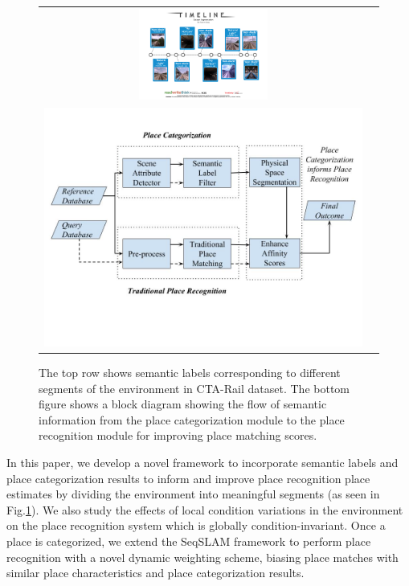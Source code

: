 \documentclass[letterpaper, 10 pt, conference]{ieeeconf}  %
\begin{document}
\begin{figure}
\centering
\begin{tabular}{cc}
	\includegraphics[clip, trim=2cm 4cm 2cm 4cm,width=6.5cm,height=3.0cm]{cta-dataset-segmentation-1}\\
	
	\includegraphics[clip, trim=0cm 4cm 0cm 2cm,scale=0.2]{flowchart}
\end{tabular}
	\caption{ The top row shows semantic labels corresponding to different segments of the environment in CTA-Rail dataset. The bottom figure shows a block diagram showing the flow of semantic information from the place categorization module to the place recognition module for improving place matching scores.}
	\label{fig:flowchart}
\end{figure}


In this paper, we develop a novel framework to incorporate semantic labels and place categorization results to inform and improve place recognition place estimates by dividing the environment into meaningful segments (as seen in Fig.\ref{fig:flowchart}). We also study the effects of local condition variations in the environment on the place recognition system which is globally condition-invariant. Once a place is categorized, we extend the SeqSLAM \cite{Milford2012} framework to perform place recognition with a novel dynamic weighting scheme, biasing place matches with similar place characteristics and place categorization results. 
\end{document}
